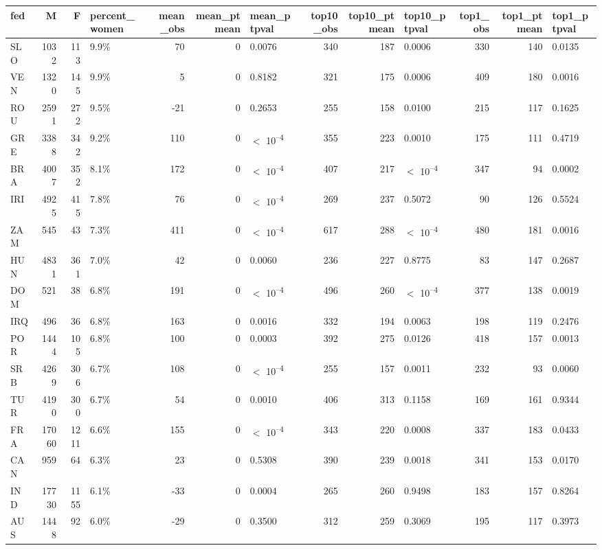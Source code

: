 
\begin{tabular}[t]{lrrlrrlrrlrrl}
\toprule
fed & M & F & percent_women & mean_obs & mean_ptmean & mean_ptpval & top10_obs & top10_ptmean & top10_ptpval & top1_obs & top1_ptmean & top1_ptpval\\
\midrule
SLO & 1032 & 113 & 9.9\% & 70 & 0 & 0.0076 & 340 & 187 & 0.0006 & 330 & 140 & 0.0135\\
VEN & 1320 & 145 & 9.9\% & 5 & 0 & 0.8182 & 321 & 175 & 0.0006 & 409 & 180 & 0.0016\\
ROU & 2591 & 272 & 9.5\% & -21 & 0 & 0.2653 & 255 & 158 & 0.0100 & 215 & 117 & 0.1625\\
GRE & 3388 & 342 & 9.2\% & 110 & 0 & $<$ 10\textsuperscript{--4} & 355 & 223 & 0.0010 & 175 & 111 & 0.4719\\
BRA & 4007 & 352 & 8.1\% & 172 & 0 & $<$ 10\textsuperscript{--4} & 407 & 217 & $<$ 10\textsuperscript{--4} & 347 & 94 & 0.0002\\
IRI & 4925 & 415 & 7.8\% & 76 & 0 & $<$ 10\textsuperscript{--4} & 269 & 237 & 0.5072 & 90 & 126 & 0.5524\\
ZAM & 545 & 43 & 7.3\% & 411 & 0 & $<$ 10\textsuperscript{--4} & 617 & 288 & $<$ 10\textsuperscript{--4} & 480 & 181 & 0.0016\\
HUN & 4831 & 361 & 7.0\% & 42 & 0 & 0.0060 & 236 & 227 & 0.8775 & 83 & 147 & 0.2687\\
DOM & 521 & 38 & 6.8\% & 191 & 0 & $<$ 10\textsuperscript{--4} & 496 & 260 & $<$ 10\textsuperscript{--4} & 377 & 138 & 0.0019\\
IRQ & 496 & 36 & 6.8\% & 163 & 0 & 0.0016 & 332 & 194 & 0.0063 & 198 & 119 & 0.2476\\
POR & 1444 & 105 & 6.8\% & 100 & 0 & 0.0003 & 392 & 275 & 0.0126 & 418 & 157 & 0.0013\\
SRB & 4269 & 306 & 6.7\% & 108 & 0 & $<$ 10\textsuperscript{--4} & 255 & 157 & 0.0011 & 232 & 93 & 0.0060\\
TUR & 4190 & 300 & 6.7\% & 54 & 0 & 0.0010 & 406 & 313 & 0.1158 & 169 & 161 & 0.9344\\
FRA & 17060 & 1211 & 6.6\% & 155 & 0 & $<$ 10\textsuperscript{--4} & 343 & 220 & 0.0008 & 337 & 183 & 0.0433\\
CAN & 959 & 64 & 6.3\% & 23 & 0 & 0.5308 & 390 & 239 & 0.0018 & 341 & 153 & 0.0170\\
IND & 17730 & 1155 & 6.1\% & -33 & 0 & 0.0004 & 265 & 260 & 0.9498 & 183 & 157 & 0.8264\\
AUS & 1448 & 92 & 6.0\% & -29 & 0 & 0.3500 & 312 & 259 & 0.3069 & 195 & 117 & 0.3973\\

\end{tabular}
